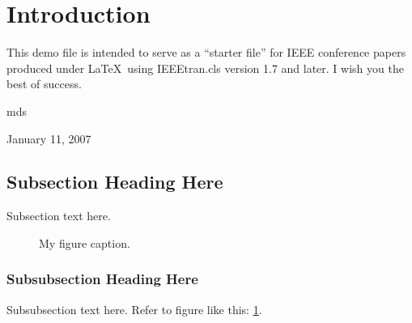 \section{Introduction}
This demo file is intended to serve as a ``starter file''
for IEEE conference papers produced under \LaTeX\ using
IEEEtran.cls version 1.7 and later.
I wish you the best of success.

\hfill mds
 
\hfill January 11, 2007

\subsection{Subsection Heading Here}
Subsection text here.

\begin{figure}
\centering

\caption{My figure caption.}
\label{fig_ref}
\end{figure}
\subsubsection{Subsubsection Heading Here}
Subsubsection text here. Refer to figure like this: \figurename \ref{fig_ref}.


